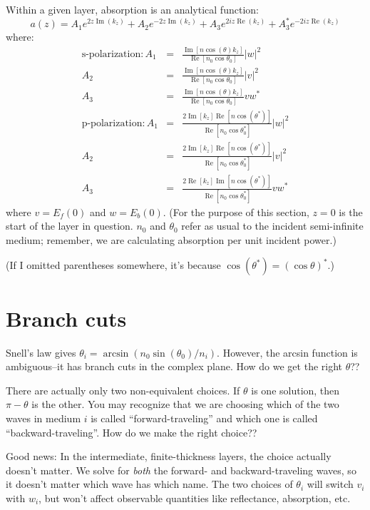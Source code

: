 \documentclass[12pt]{article}
\newcommand{\bea}{\begin{eqnarray*}} %
\newcommand{\eea}{\end{eqnarray*}} %
\renewcommand{\(}{\left(}
\renewcommand{\)}{\right)}
\renewcommand{\Im}{\operatorname{Im}}
\renewcommand{\Re}{\operatorname{Re}}
\begin{document}
Within a given layer, absorption is an analytical function:
$$a(z) = A_1e^{2 z \Im(k_z)} + A_2e^{-2 z \Im(k_z)} + A_3e^{2iz\Re(k_z)} + A_3^* e^{-2iz \Re(k_z)}$$
where:
\bea
\text{s-polarization}: A_1 &=& \frac{\Im\left[ n \cos(\theta) k_z\right] }{\Re\left[ n_0 \cos \theta_0 \right] }|w|^2\\
A_2 &=& \frac{\Im\left[ n \cos(\theta) k_z\right] }{\Re \left[ n_0 \cos \theta_0 \right] }|v|^2\\
A_3 &=& \frac{\Im\left[ n \cos(\theta) k_z\right] }{\Re \left[ n_0 \cos \theta_0 \right] }vw^*\\
\text{p-polarization}: A_1 &=& \frac{2\Im\left[ k_z\right] \Re\left[ n \cos(\theta^*)\right] }{\Re \left[ n_0 \cos \theta_0^* \right] } |w|^2\\
A_2 &=& \frac{2\Im\left[ k_z \right] \Re \left[ n \cos(\theta^*)\right] }{\Re \left[ n_0 \cos \theta_0^* \right] } |v|^2\\
A_3 &=& \frac{2\Re\left[ k_z \right] \Im \left[ n \cos(\theta^*)\right] }{\Re \left[ n_0 \cos \theta_0^* \right] } vw^*
\eea
where $v = E_f(0)$ and $w=E_b(0)$. (For the purpose of this section, $z=0$ is the start of the layer in question. $n_0$ and $\theta_0$ refer as usual to the incident semi-infinite medium; remember, we are calculating absorption per unit incident power.)

(If I omitted parentheses somewhere, it's because $\cos (\theta^*) = (\cos \theta)^*$.)

\section{Branch cuts \label{branchcuts}}

Snell's law gives $\theta_i = \arcsin(n_0 \sin(\theta_0)/n_i)$. However, the arcsin function is ambiguous--it has branch cuts in the complex plane. How do we get the right $\theta$??

There are actually only two non-equivalent choices. If $\theta$ is one solution, then $\pi-\theta$ is the other. You may recognize that we are choosing which of the two waves in medium $i$ is called ``forward-traveling'' and which one is called ``backward-traveling''. How do we make the right choice??

Good news: In the intermediate, finite-thickness layers, the choice actually doesn't matter. We solve for \emph{both} the forward- and backward-traveling waves, so it doesn't matter which wave has which name. The two choices of $\theta_i$ will switch $v_i$ with $w_i$, but won't affect observable quantities like reflectance, absorption, etc.
\end{document}
